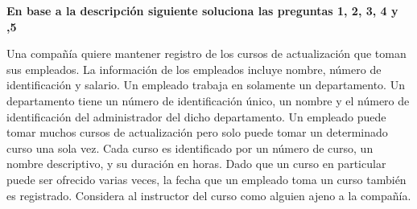 \documentclass[]{article}
\begin{document}
    \setlength{\headheight}{23.10004pt}
    \addtolength{\topmargin}{-11.10004pt}

    \noindent
    \textbf{En base a la descripción siguiente soluciona las preguntas 1, 2, 3, 4 y ,5}
    
    \medspace
    
    \noindent
    Una compañía quiere mantener registro de los cursos de actualización que toman sus empleados. La
    información de los empleados incluye nombre, número de identificación y salario. Un empleado trabaja en
    solamente un departamento. Un departamento tiene un número de identificación único, un nombre y el número
    de identificación del administrador del dicho departamento. Un empleado puede tomar muchos cursos de
    actualización pero solo puede tomar un determinado curso una sola vez. Cada curso es identificado por un
    número de curso, un nombre descriptivo, y su duración en horas. Dado que un curso en particular puede ser
    ofrecido varias veces, la fecha que un empleado toma un curso también es registrado.
    Considera al instructor del curso como alguien ajeno a la compañía.
\end{document}

